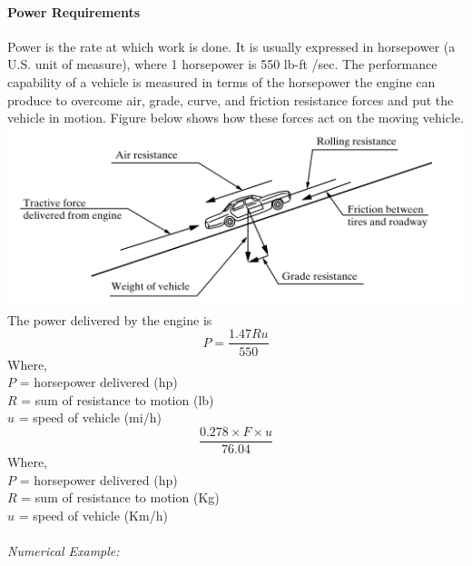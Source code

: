 \paragraph{Power Requirements}
Power is the rate at which work is done. It is usually expressed in horsepower (a U.S. unit of measure), where 1 horsepower is 550 lb-ft /sec. The performance capability of a vehicle is measured in terms of the horsepower the engine can produce to overcome air, grade, curve, and friction resistance forces and put the vehicle in motion. Figure below shows how these forces act on the moving vehicle.\\
\includegraphics[scale=0.9]{gfx/fig9.png}\\
The power delivered by the engine is
\begin{equation}
	P = \frac{1.47Ru}{550}
\end{equation}
Where,\\
\hspace*{10mm}$P$ = horsepower delivered (hp)\\
\hspace*{10mm}$R$ = sum of resistance to motion (lb)\\
\hspace*{10mm}$u$ = speed of vehicle (mi/h)
\begin{equation}
	\frac{0.278 \times F \times u}{76.04}
\end{equation}
Where,\\
\hspace*{10mm}$P$ = horsepower delivered (hp)\\
\hspace*{10mm}$R$ = sum of resistance to motion (Kg)\\
\hspace*{10mm}$u$ = speed of vehicle (Km/h)\\\\
\emph{Numerical Example:}\\
